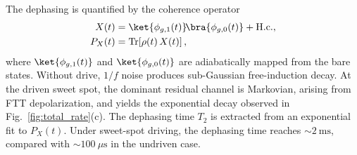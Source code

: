 The dephasing is quantified by the coherence operator
\begin{align}
X(t) &= \ket{\phi_{g,1}(t)}\!\bra{\phi_{g,0}(t)} + \mathrm{H.c.}, \\
P_X(t) &= \mathrm{Tr}\!\left[\rho(t)\,X(t)\right],
\end{align}
where $\ket{\phi_{g,1}(t)}$ and $\ket{\phi_{g,0}(t)}$ are adiabatically mapped from the bare states.
Without drive, \(1/f\) noise produces sub-Gaussian free-induction decay. At the driven sweet spot, the dominant residual channel is Markovian, arising from FTT depolarization, and yields the exponential decay observed in Fig.~\ref{fig:total_rate}(c). The dephasing time \(T_2\) is extracted from an exponential fit to \(P_X(t)\). Under sweet-spot driving, the dephasing time reaches \(\sim 2~\mathrm{ms}\), compared with \(\sim 100~\mu\mathrm{s}\) in the undriven case.
